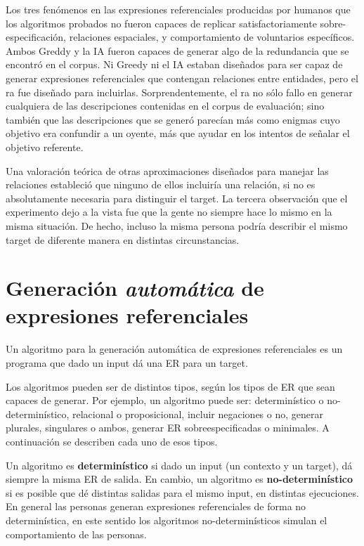 Los tres fen\'omenos en las expresiones referenciales producidas por humanos que los
algoritmos probados no fueron capaces de replicar satisfactoriamente sobre-especificaci\'on,
relaciones espaciales, y comportamiento de voluntarios espec\'ificos. Ambos
Greddy y la IA fueron capaces de generar algo de la redundancia que se encontr\'o en el corpus.
 Ni Greedy ni el IA estaban dise\~nados para ser capaz de generar expresiones referenciales que contengan relaciones entre entidades, pero el ra fue dise\~nado para incluirlas. Sorprendentemente, el
ra no s\'olo fallo en generar cualquiera de las descripciones contenidas en el corpus de evaluaci\'on; sino tambi\'en que las descripciones que se gener\'o parec\'ian m\'as como enigmas cuyo objetivo era confundir a un oyente, m\'as que ayudar en
los intentos de se\~nalar el objetivo referente. 

Una valoraci\'on te\'orica de otras aproximaciones dise\~nados para manejar las relaciones estableci\'o que ninguno de ellos incluir\'ia una relaci\'on, si no es absolutamente necesaria para distinguir el target.
La tercera observaci\'on que el experimento dejo a la vista fue que la gente no siempre hace lo mismo en la misma situaci\'on. De hecho, incluso la misma persona podr\'ia describir el mismo target de diferente manera en distintas
circunstancias. 





\section{Generaci\'on \emph{autom\'atica} de expresiones referenciales}
\label{sec:tipos_algoritmos}

Un algoritmo para la generaci\'on autom\'atica de expresiones referenciales es un programa que dado un input d\'a una ER para un target.

Los algoritmos pueden ser de distintos tipos, seg\'un los tipos de ER que sean capaces de generar. Por ejemplo, un algoritmo puede ser: determin\'{i}stico o no-determin\'{i}stico, relacional o proposicional, incluir negaciones o no, generar plurales, singulares o ambos,
generar ER sobreespecificadas o minimales. A continuaci\'on se describen cada uno de esos tipos.

Un algoritmo es {\bf determin\'{i}stico} si dado un input (un contexto y un target), d\'a siempre la misma ER de salida. En cambio, un algoritmo es {\bf no-determin\'{i}stico} si es posible que d\'e distintas salidas para el mismo input, en distintas ejecuciones. En general las personas generan expresiones referenciales de forma no determin\'istica, en este sentido los algoritmos no-determin\'isticos simulan el comportamiento de las personas. 

